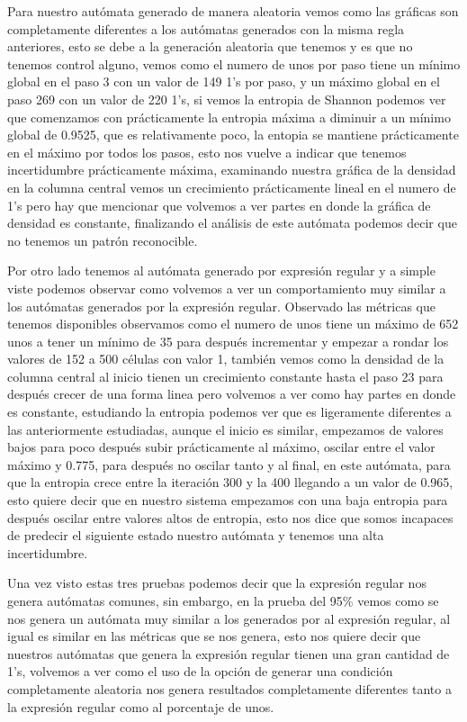 \documentclass[11pt]{article}
\begin{document}
		 Para nuestro autómata generado de manera aleatoria vemos como las gráficas son completamente diferentes a los autómatas generados con la misma regla anteriores, esto se debe a la generación aleatoria que tenemos y es que no tenemos control alguno, vemos como el numero de unos por paso tiene un mínimo global en el paso 3 con un valor de 149 1's por paso, y un máximo global en el paso 269 con un valor de 220 1's, si vemos la entropia de Shannon podemos ver que comenzamos con prácticamente la entropia máxima a diminuir a un mínimo global de 0.9525, que es relativamente poco, la entopia se mantiene prácticamente en el máximo por todos los pasos, esto nos vuelve a indicar que tenemos incertidumbre prácticamente máxima, examinando nuestra gráfica de la densidad en la columna central vemos un crecimiento prácticamente lineal en el numero de 1's pero hay que mencionar que volvemos a ver partes en donde la gráfica de densidad es constante, finalizando el análisis de este autómata podemos decir que no tenemos un patrón reconocible.\par
		 Por otro lado tenemos al autómata generado por expresión regular y a simple viste podemos observar como volvemos a ver un comportamiento muy similar a los autómatas generados por la expresión regular. Observado las métricas que tenemos disponibles observamos como el numero de unos tiene un máximo de 652 unos a tener un mínimo de 35 para después incrementar y empezar a rondar los valores de 152 a 500 células con valor 1, también vemos como la densidad de la columna central al inicio tienen un crecimiento constante hasta el paso 23 para después crecer de una forma linea pero volvemos a ver como hay partes en donde es constante, estudiando la entropia podemos ver que es ligeramente diferentes a las anteriormente estudiadas, aunque el inicio es similar, empezamos de valores bajos para poco después subir prácticamente al máximo, oscilar entre el valor máximo y 0.775, para después no oscilar tanto y al final, en este autómata, para que la entropia crece entre la iteración 300 y la 400 llegando a un valor de 0.965, esto quiere decir que en nuestro sistema empezamos con una baja entropia para después oscilar entre valores altos de entropia, esto nos dice que somos incapaces de predecir el siguiente estado nuestro autómata y tenemos una alta incertidumbre.\par
		 Una vez visto estas tres pruebas podemos decir que la expresión regular nos genera autómatas comunes, sin embargo, en la prueba del 95\% vemos como se nos genera un autómata muy similar a los generados por al expresión regular, al igual es similar en las métricas que se nos genera, esto nos quiere decir que nuestros autómatas que genera la expresión regular tienen una gran cantidad de 1's, volvemos a ver como el uso de la opción de generar una condición completamente aleatoria nos genera resultados completamente diferentes tanto a la expresión regular como al porcentaje de unos.	
\end{document}
